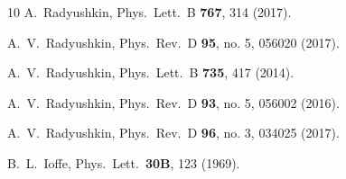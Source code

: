 \begin{thebibliography}{10}
  A.~Radyushkin,
  Phys.\ Lett.\ B {\bf 767}, 314 (2017).

  A.~V.~Radyushkin,
  Phys.\ Rev.\ D {\bf 95}, no. 5, 056020 (2017).

  A.~V.~Radyushkin,
  Phys.\ Lett.\ B {\bf 735}, 417 (2014).



  A.~V.~Radyushkin,
  Phys.\ Rev.\ D {\bf 93}, no. 5, 056002 (2016).


  
  A.~V.~Radyushkin,
  Phys.\ Rev.\ D {\bf 96}, no. 3, 034025 (2017).


  B.~L.~Ioffe,
  Phys.\ Lett.\  {\bf 30B}, 123 (1969).




\end{thebibliography}
